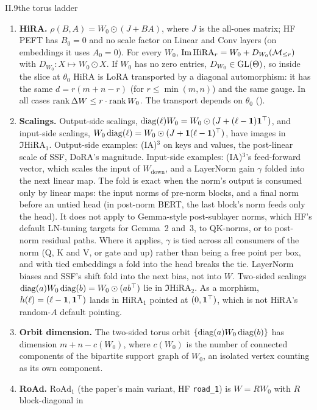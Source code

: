 \begin{proposition}{II.9}{the torus ladder}
\begin{enumerate}[label=(\alph*)]
  \item \textbf{HiRA.} $\rho(B,A)=W_0\odot(J+BA)$, where $J$ is the all-ones matrix; HF PEFT has $B_0=0$ and no scale
    factor on Linear and Conv layers (on embeddings it uses $A_0=0$). For every $W_0$,
    $\operatorname{Im}\mathrm{HiRA}_r=W_0+D_{W_0}(\mathcal{M}_{\le r})$ with $D_{W_0}:X\mapsto W_0\odot X$. If $W_0$ has no zero entries,
    $D_{W_0}\in\mathrm{GL}(\Theta)$, so inside the slice at $\theta_0$ HiRA is LoRA transported by a diagonal automorphism: it has
    the same $d=r(m+n-r)$ (for $r\le\min(m,n)$) and the same gauge. In all cases $\operatorname{rank}\Delta W\le r\cdot\operatorname{rank} W_0$. The
    transport depends on $\theta_0$ ().
  \item \textbf{Scalings.} Output-side scalings, $\operatorname{diag}(\ell)W_0=W_0\odot(J+(\ell-\mathbf 1)\mathbf 1^{\top})$, and
    input-side scalings, $W_0\operatorname{diag}(\ell)=W_0\odot(J+\mathbf 1(\ell-\mathbf 1)^{\top})$, have images in $\Im\mathrm{HiRA}_1$.
    Output-side examples: (IA)$^3$ on keys and values, the post-linear scale of SSF, DoRA's magnitude. Input-side
    examples: (IA)$^3$'s feed-forward vector, which scales the input of $W_{\mathrm{down}}$, and a LayerNorm gain
    $\gamma$ folded into the next linear map. The fold is exact when the norm's output is consumed only by linear maps:
    the input norms of pre-norm blocks, and a final norm before an untied head (in post-norm BERT, the last block's norm
    feeds only the head). It does not apply to Gemma-style post-sublayer norms, which HF's default LN-tuning targets for
    Gemma~2 and~3, to QK-norms, or to post-norm residual paths. Where it applies, $\gamma$ is tied across all consumers of
    the norm (Q, K and V, or gate and up) rather than being a free point per box, and with tied embeddings a fold into
    the head breaks the tie. LayerNorm biases and SSF's shift fold into the next bias, not into $W$. Two-sided scalings
    $\operatorname{diag}(a)W_0\operatorname{diag}(b)=W_0\odot(ab^{\top})$ lie in $\Im\mathrm{HiRA}_2$. As a morphism, $h(\ell)=(\ell-\mathbf 1,\mathbf
    1^{\top})$ lands in $\mathrm{HiRA}_1$ pointed at $(0,\mathbf 1^{\top})$, which is not HiRA's random-$A$ default pointing.
  \item \textbf{Orbit dimension.} The two-sided torus orbit $\{\operatorname{diag}(a)W_0\operatorname{diag}(b)\}$ has dimension $m+n-c(W_0)$, where
    $c(W_0)$ is the number of connected components of the bipartite support graph of $W_0$, an isolated vertex counting
    as its own component.
  \item \textbf{RoAd.} RoAd$_1$ (the paper's main variant, HF \texttt{road\_1}) is $W=RW_0$ with $R$ block-diagonal in

\end{enumerate}
\end{proposition}
